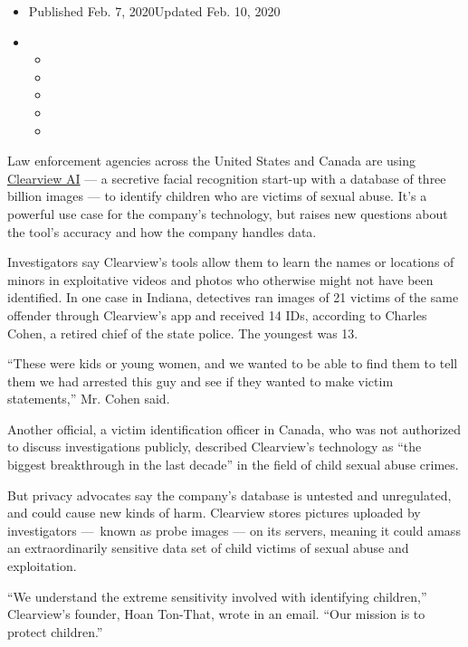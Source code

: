 \begin{itemize}
\item
  Published Feb. 7, 2020Updated Feb. 10, 2020
\item
  \begin{itemize}
  \item
  \item
  \item
  \item
  \item
  \end{itemize}
\end{itemize}

Law enforcement agencies across the United States and Canada are using
\href{https://www.nytimes3xbfgragh.onion/2020/02/10/podcasts/the-daily/facial-recognition-surveillance.html}{Clearview
AI} --- a secretive facial recognition start-up with a database of three
billion images --- to identify children who are victims of sexual abuse.
It's a powerful use case for the company's technology, but raises new
questions about the tool's accuracy and how the company handles data.

Investigators say Clearview's tools allow them to learn the names or
locations of minors in exploitative videos and photos who otherwise
might not have been identified. In one case in Indiana, detectives ran
images of 21 victims of the same offender through Clearview's app and
received 14 IDs, according to Charles Cohen, a retired chief of the
state police. The youngest was 13.

``These were kids or young women, and we wanted to be able to find them
to tell them we had arrested this guy and see if they wanted to make
victim statements,'' Mr. Cohen said.

Another official, a victim identification officer in Canada, who was not
authorized to discuss investigations publicly, described Clearview's
technology as ``the biggest breakthrough in the last decade'' in the
field of child sexual abuse crimes.

But privacy advocates say the company's database is untested and
unregulated, and could cause new kinds of harm. Clearview stores
pictures uploaded by investigators ---~known as probe images --- on its
servers, meaning it could amass an extraordinarily sensitive data set of
child victims of sexual abuse and exploitation.

``We understand the extreme sensitivity involved with identifying
children,'' Clearview's founder, Hoan Ton-That, wrote in an email. ``Our
mission is to protect children.''

